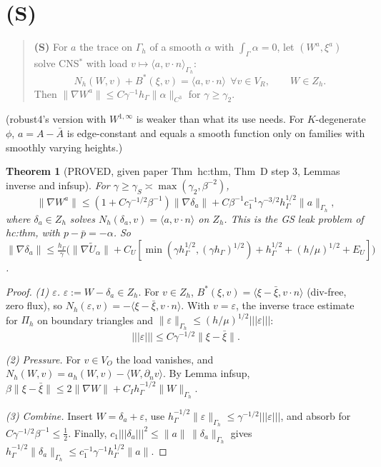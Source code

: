 \documentclass[11pt]{article}
\newtheorem{theorem}{Theorem}[section]
\theoremstyle{remark}
\newcommand{\hG}{h_\Gamma}
\newcommand{\Gh}{\Gamma_h}
\newcommand{\ip}[2]{\langle #1,#2\rangle}
\newcommand{\tn}[1]{|\!|\!|#1|\!|\!|}
\begin{document}
\section{(S)}
\begin{quote}
\textbf{(S)} For $a$ the trace on $\Gh$ of a smooth $\alpha$ with $\int_\Gamma\alpha=0$, let $(W^a,\xi^a)$ solve CNS$^\ast$ with load $v\mapsto\ip a{v\cdot n}_{\Gh}$:
\[
N_h(W,v)+B^\ast(\xi,v)=\ip a{v\cdot n}\ \ \forall v\in V_R,\qquad W\in Z_h .
\]
Then $\|\nabla W^a\|\le C\gamma^{-1}\hG\|\alpha\|_{C^3}$ for $\gamma\ge\gamma_2$.
\end{quote}
(robust4's version with $W^{1,\infty}$ is weaker than what its use needs. For $K$-degenerate $\phi$, $a=A-\bar A$ is
edge-constant and equals a smooth function only on families with smoothly varying heights.)

\begin{theorem}[PROVED, given paper Thm~hc:thm, Thm~D step 3, Lemmas inverse and infsup]\label{thm:S1}
For $\gamma\ge\gamma_S\asymp\max(\gamma_2,\beta^{-2})$,
\[
\|\nabla W^a\|\le(1+C\gamma^{-1/2}\beta^{-1})\|\nabla\delta_a\|+C\beta^{-1}c_1^{-1}\gamma^{-3/2}\hG^{1/2}\|a\|_{\Gh},
\]
where $\delta_a\in Z_h$ solves $N_h(\delta_a,v)=\ip a{v\cdot n}$ on $Z_h$. This is the GS leak problem of hc:thm, with $p-\bar p=-\alpha$. So
$\|\nabla\delta_a\|\le\frac{\hG}{\gamma}\big(\|\nabla\tilde U_\alpha\|+C_U[\min(\gamma\hG^{1/2},(\gamma\hG)^{1/2})+\hG^{1/2}+(h/\mu)^{1/2}+E_U]\big)$.
\end{theorem}
\begin{proof}
\emph{(1) $\varepsilon$.} $\varepsilon:=W-\delta_a\in Z_h$. For $v\in Z_h$, $B^\ast(\xi,v)=\ip{\xi-\bar\xi}{v\cdot n}$ (div-free, zero flux), so
$N_h(\varepsilon,v)=-\ip{\xi-\bar\xi}{v\cdot n}$. With $v=\varepsilon$, the inverse trace estimate for $\Pi_h$ on boundary triangles and
$\|\varepsilon\|_{\Gh}\le(h/\mu)^{1/2}\tn\varepsilon$:
\[
\tn\varepsilon\le C\gamma^{-1/2}\|\xi-\bar\xi\| .
\]

\emph{(2) Pressure.} For $v\in V_O$ the load vanishes, and $N_h(W,v)=a_h(W,v)-\ip W{\partial_nv}$. By Lemma infsup,
$\beta\|\xi-\bar\xi\|\le2\|\nabla W\|+C_I\hG^{-1/2}\|W\|_{\Gh}$.

\emph{(3) Combine.} Insert $W=\delta_a+\varepsilon$, use $\hG^{-1/2}\|\varepsilon\|_{\Gh}\le\gamma^{-1/2}\tn\varepsilon$, and absorb for
$C\gamma^{-1/2}\beta^{-1}\le\frac12$. Finally, $c_1\tn{\delta_a}^2\le\|a\|\,\|\delta_a\|_{\Gh}$ gives
$\hG^{-1/2}\|\delta_a\|_{\Gh}\le c_1^{-1}\gamma^{-1}\hG^{1/2}\|a\|$.
\end{proof}
\end{document}
